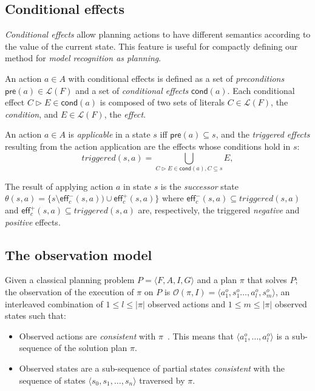 \documentclass[letterpaper]{article} %
\newcommand{\tup}[1]{{\langle #1 \rangle}}
\newcommand{\pre}{\mathsf{pre}}     %
\newcommand{\eff}{\mathsf{eff}}     %
\newcommand{\cond}{\mathsf{cond}}   %
\begin{document}
\subsection{Conditional effects}
{\em Conditional effects} allow planning actions to have different semantics according to the value of the current state. This feature is useful for compactly defining our method for {\em model recognition as planning}. 

An action $a\in A$ with conditional effects is defined as a set of {\em preconditions} $\pre(a)\in\mathcal{L}(F)$ and a set of {\em conditional effects} $\cond(a)$. Each conditional effect $C\rhd E\in\cond(a)$ is composed of two sets of literals $C\in\mathcal{L}(F)$, the {\em condition}, and $E\in\mathcal{L}(F)$, the {\em effect}.

An action $a\in A$ is {\em applicable} in a state $s$ iff $\pre(a)\subseteq s$, and the {\em triggered effects} resulting from the action application are the effects whose conditions hold in $s$:
\[
triggered(s,a)=\bigcup_{C\rhd E\in\cond(a),C\subseteq s} E,
\]

The result of applying action $a$ in state $s$ is the {\em successor} state $\theta(s,a)=\{s\setminus\eff_c^-(s,a))\cup\eff_c^+(s,a)\}$ where $\eff_c^-(s,a)\subseteq triggered(s,a)$ and $\eff_c^+(s,a)\subseteq triggered(s,a)$ are, respectively, the triggered {\em negative} and {\em positive} effects.

\subsection{The observation model}
Given a classical planning problem $P=\tup{F,A,I,G}$ and a plan $\pi$ that solves $P$; the observation of the execution of $\pi$ on $P$ is $\mathcal{O}(\pi,I)=\tup{a_1^o,s_1^o \ldots , a_l^o, s_m^o}$, an interleaved combination of {\small $1\leq l\leq |\pi|$} observed actions and {\small $1\leq m\leq |\pi|$} observed states such that:
\begin{itemize}
\item Observed actions are {\em consistent} with $\pi$~\cite{ramirez2009plan}. This means that $\tup{a_1^o, \ldots, a_l^o}$ is a sub-sequence of the solution plan $\pi$.
\item Observed states are a sub-sequence  of partial states {\em consistent} with the sequence of states $\tup{s_0, s_1, \ldots, s_n}$ traversed by $\pi$. 
\end{itemize}
\end{document}
